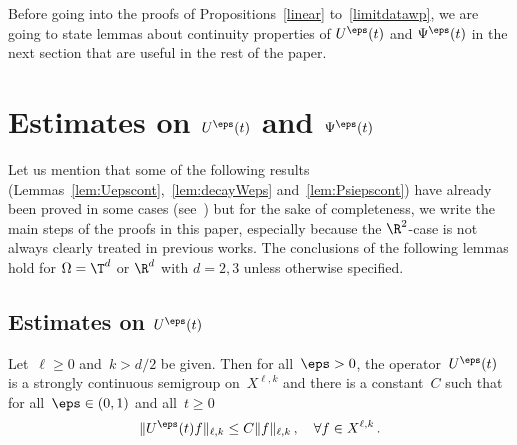 Before going into the proofs of Propositions~\ref{linear} to~\ref{limitdatawp}, we are going to state lemmas about continuity properties of $U^\eps(t)$ and $\Psi^\eps(t)$ in the next section that are useful in the rest of the paper.

\section{Estimates on \texorpdfstring{$U^\eps(t)$}{U eps(t)} and \texorpdfstring{$\Psi^\eps(t)$}{Psi eps(t)}}
Let us mention that some of the following results (Lemmas~\ref{lem:Uepscont},~\ref{lem:decayWeps} and~\ref{lem:Psiepscont}) have already been proved in some cases (see~\cite{Bardos-Ukai}) but for the sake of completeness, we write the main steps of the proofs in this paper, especially because the $\R^2$-case is not always clearly treated in previous works. The conclusions of the following lemmas hold for $\Omega=\T^d$ or $\R^d$ with $d=2,3$ unless otherwise specified.


\subsection{Estimates on \texorpdfstring{$U^\eps(t)$}{U eps(t)}}

\begin{lemm}\label{lem:Uepscont}
Let~$\ell \ge 0$ and~${k>d/2}$ be given. Then for all~$\eps>0$, the operator~$ U^\eps(t) $ is a strongly continuous semigroup on~$X^{\ell,k}$ and there is a constant~$C$ such that for all~$\eps \in (0,1)$ and all~$t \geq 0$
\begin{equation}\label{boundUeps}
\|U^\eps(t) f \|_{\ell,k} \leq C \| f\|_{\ell,k} \,, \quad \forall f \in X^{\ell,k} \,.
\end{equation}
\end{lemm}

